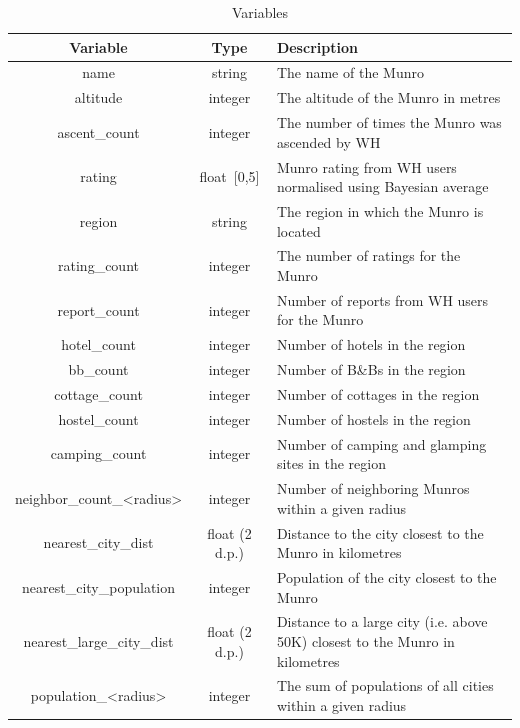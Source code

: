 \documentclass[11pt,a4paper]{article}
\begin{document}
\begin{table}
    \centering
     \begin{tabular}{|c | c | l|} 
     \hline
     Variable & Type & Description  \\ 
     \hline\hline
     name & string & The name of the Munro \\ 
     \hline
     altitude & integer & The altitude of the Munro in metres \\
     \hline
     ascent\_count & integer & The number of times the Munro was ascended by WH \\
     \hline
     rating & float\ [0,5] & Munro rating from WH users normalised using Bayesian average \\
     \hline
     region & string & The region in which the Munro is located \\
     \hline 
     rating\_count & integer & The number of ratings for the Munro \\
     \hline 
     report\_count & integer & Number of reports from WH users for the Munro \\
     \hline 
     hotel\_count & integer & Number of hotels in the region \\
     \hline 
     bb\_count & integer & Number of B\&Bs in the region \\
     \hline 
     cottage\_count & integer & Number of cottages in the region \\
     \hline
     hostel\_count & integer & Number of hostels in the region \\
     \hline
     camping\_count & integer & Number of camping and glamping sites in the region \\
     \hline
     neighbor\_count\_<radius> & integer & Number of neighboring Munros within a given radius \\
     \hline 
     nearest\_city\_dist & float (2 d.p.) & Distance to the city closest to the Munro in kilometres \\
     \hline
     nearest\_city\_population & integer & Population of the city closest to the Munro\\
     \hline 
     nearest\_large\_city\_dist & float (2 d.p.) & Distance to a large city (i.e. above 50K) closest to the Munro in kilometres\\
     \hline 
     population\_<radius> & integer & The sum of populations of all cities within a given radius \\
     \hline
    \end{tabular}
    \caption{Variables}
    \label{table:1}
\end{table}
\end{document}
